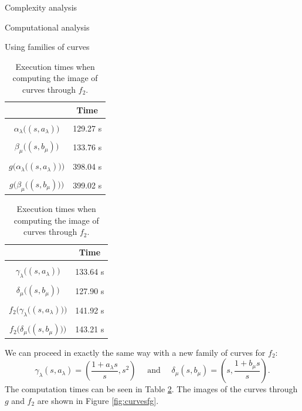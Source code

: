 \documentclass[11pt, a4paper, english, twoside, notitlepage, openright]{report}
\begin{document}
\begin{chapter}{Complexity analysis}
\begin{section}{Computational analysis}
\begin{subsection}{Using families of curves}
\begin{table}[ht!]
\parbox{.45\linewidth}{
\centering
\begin{tabular}{c || c }
 & Time  \\ \hline \hline
\\[-1em]
$\alpha_{\lambda}\big((s,a_\lambda)\big)$ &  129.27 s\\ \hline
\\[-1em]
$\beta_{\mu}\big((s,b_\mu)\big)$ &133.76 s \\ \hline
\\[-1em]
$g\big(\alpha_{\lambda}\big((s,a_\lambda)\big)\big)$ & 398.04 s  \\ \hline
\\[-1em]
$g\big(\beta_{\mu}\big((s,b_\mu)\big)\big)$ & 399.02 s \\
\end{tabular}
\caption[]{Execution times when computing the image of curves through $g$.}\label{tab:curves1}
}
\hfill
\parbox{.45\linewidth}{
\centering
\begin{tabular}{c || c }
 & Time  \\ \hline \hline
\\[-1em]
$\gamma_{\lambda}\big((s, a_\lambda)\big)$ & 133.64 s \\ \hline
\\[-1em]
$\delta_{\mu}\big((s, b_\mu)\big)$ &127.90 s \\ \hline
\\[-1em]
$f_2\big(\gamma_{\lambda}\big((s, a_\lambda)\big)\big)$ & 141.92 s  \\ \hline
\\[-1em]
$f_2\big(\delta_{\mu}\big((s, b_\mu)\big)\big)$ & 143.21 s \\
\end{tabular}
\caption[]{Execution times when computing the image of curves through $f_2$.}\label{tab:curves3}
}
\end{table}

We can proceed in exactly the same way with a new family of curves for $f_2$:
$$
\gamma_\lambda(s, a_\lambda) = \left(\frac{1+a_\lambda s}{s}, s^2\right)
\quad \text{ and } \quad
\delta_\mu(s, b_\mu) = \left(s, \frac{1+b_\mu s}{s}\right).
$$
The computation times can be seen in Table \ref{tab:curves3}. The images of the curves through $g$ and $f_2$ are shown in Figure \ref{fig:curvesfg}.


\end{subsection}
\end{section}
\end{chapter}
\end{document}
